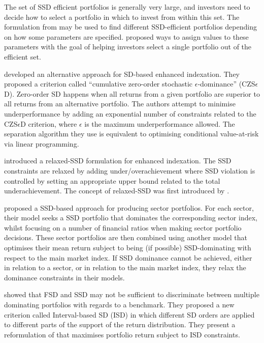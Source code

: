The set of SSD efficient portfolios is generally very large, and investors need to decide how to select a portfolio in which to invest
from within  this set. The formulation from \cite{post2013} may be used to find different SSD-efficient portfolios depending on how some parameters are specified. \cite{hodder2015} proposed ways to assign values to these parameters with the goal of helping investors select a single portfolio out of the efficient set.


\cite{bruni2016, bruni2012} developed an alternative approach for SD-based enhanced indexation. They proposed
 a criterion called ``cumulative zero-order stochastic $\epsilon$-dominance'' (CZS$\epsilon$D). Zero-order SD happens when all returns from a given portfolio are superior to all returns from an alternative portfolio. The authors attempt to minimise underperformance by adding an exponential number of constraints related to the  CZS$\epsilon$D criterion, where $\epsilon$ is the maximum underperformance allowed. The separation algorithm they use  is equivalent to optimising conditional value-at-risk via linear programming.

\cite{sharma2017} introduced a relaxed-SSD formulation for enhanced indexation. The SSD constraints are relaxed by adding under/overachievement
where  SSD violation is controlled by setting an appropriate upper bound related to the total underachievement. The concept of relaxed-SSD was first introduced by \cite{lizyayev2012}. 

\cite{sharma2017b} proposed a SSD-based approach for producing sector portfolios. 
For each sector, their model seeks a SSD portfolio that dominates the corresponding sector index, whilst focusing on 
a number of financial ratios
when making sector portfolio decisions. These sector portfolios are then combined using another model that optimises 
their mean return subject to being  (if possible) SSD-dominating with respect to the main market index. If SSD dominance cannot be 
achieved, either in relation to a sector, or in relation to the main market index, they 
relax the dominance constraints in their models.


\cite{liu2021} showed that FSD and SSD may not be sufficient to discriminate between
multiple dominating portfolios with regards to a benchmark. They proposed a new criterion called Interval-based SD (ISD) in which different SD orders are applied to different parts of the support of the return distribution. They present a reformulation of \cite{dentcheva2006} that maximises portfolio return subject to ISD constraints.


